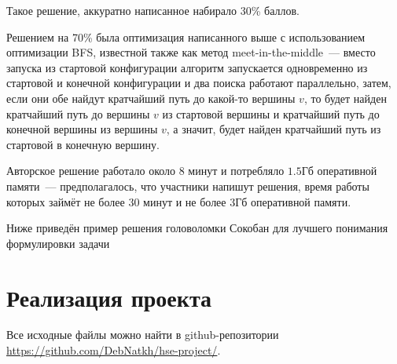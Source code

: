 \documentclass[a4paper]{article}
\begin{document}
Такое решение, аккуратно написанное набирало 30\% баллов.

Решением на 70\% была оптимизация написанного выше с использованием оптимизации BFS, известной также как метод meet-in-the-middle~--- вместо запуска из стартовой конфигурации алгоритм запускается одновременно из стартовой и конечной конфигурации и два поиска работают параллельно, затем, если они обе найдут кратчайший путь до какой-то вершины $v$, то будет найден кратчайший путь до вершины $v$ из стартовой вершины и кратчайший путь до конечной вершины из вершины $v$, а значит, будет найден кратчайший путь из стартовой в конечную вершину.

Авторское решение работало около 8 минут и потребляло $1.5$Гб оперативной памяти~--- предполагалось, что участники напишут решения, время работы которых займёт не более $30$ минут и не более $3$Гб оперативной памяти.

Ниже приведён пример решения головоломки Сокобан для лучшего понимания формулировки задачи

\begin{figure}[ht]
\begin{center}
\end{center}
\end{figure}

 
\newpage
\section{Реализация проекта}

Все исходные файлы можно найти в github-репозитории \url{https://github.com/DebNatkh/hse-project/}.
\end{document}
